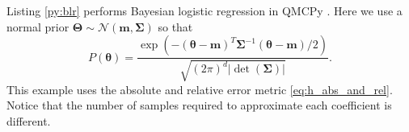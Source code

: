 \documentclass[graybox]{svmult}
\begin{document}
Listing \ref{py:blr} performs Bayesian logistic regression in QMCPy
. Here we use a normal prior $\boldsymbol{\Theta} \sim \mathcal{N}(\boldsymbol{m},\boldsymbol{\Sigma})$ so that
$$P(\boldsymbol{\theta}) = \frac{\exp\left(-(\boldsymbol{\theta}-\boldsymbol{m})^T\boldsymbol{\Sigma}^{-1}(\boldsymbol{\theta}-\boldsymbol{m})/2\right)}{\sqrt{(2\pi)^d\lvert \det(\boldsymbol{\Sigma})\rvert }}.$$
This example uses the absolute and relative error metric \eqref{eq:h_abs_and_rel}. Notice that the number of samples required to approximate each coefficient is different. 





\end{document}
